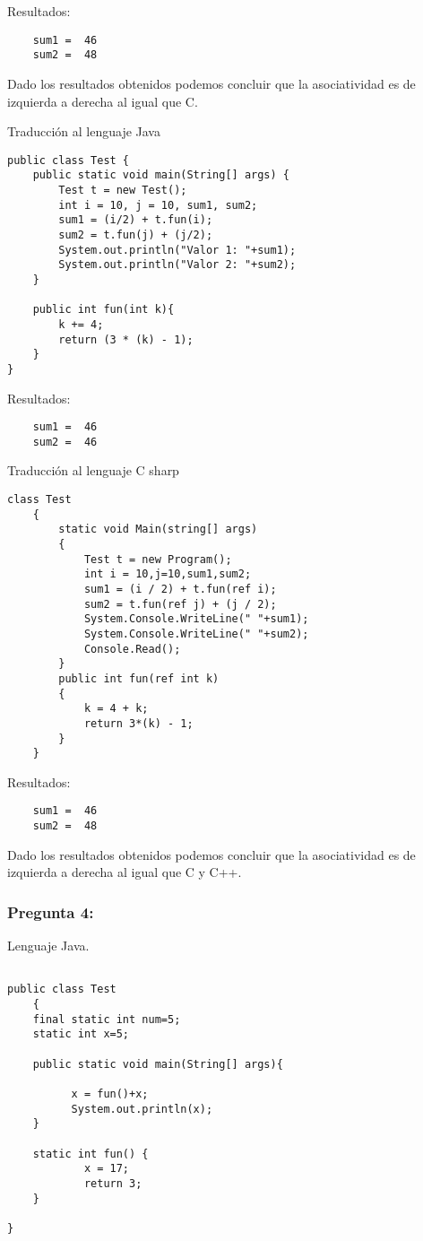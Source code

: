 \documentclass[11pt]{article}
\begin{document}
\noindent Resultados:
\begin{verbatim}
	sum1 =  46
	sum2 =  48
\end{verbatim}

Dado los resultados obtenidos podemos concluir que la asociatividad es de izquierda a derecha al igual que C.

Traducción al lenguaje Java

\begin{lstlisting}[frame = single]
public class Test {
    public static void main(String[] args) {
        Test t = new Test();
        int i = 10, j = 10, sum1, sum2;
        sum1 = (i/2) + t.fun(i);
        sum2 = t.fun(j) + (j/2);
        System.out.println("Valor 1: "+sum1);
        System.out.println("Valor 2: "+sum2);
    }

    public int fun(int k){
        k += 4;
        return (3 * (k) - 1);
    }
}
\end{lstlisting}
\noindent Resultados:
\begin{verbatim}
	sum1 =  46
	sum2 =  46
\end{verbatim}

Traducción al lenguaje C sharp

\begin{lstlisting}[frame = single]
class Test
    {
        static void Main(string[] args)
        {
            Test t = new Program();
            int i = 10,j=10,sum1,sum2;
            sum1 = (i / 2) + t.fun(ref i);
            sum2 = t.fun(ref j) + (j / 2);
            System.Console.WriteLine(" "+sum1);
            System.Console.WriteLine(" "+sum2);
            Console.Read();
        }
        public int fun(ref int k)
        {
            k = 4 + k;
            return 3*(k) - 1;
        }
    }
\end{lstlisting}
\noindent Resultados:
\begin{verbatim}
	sum1 =  46
	sum2 =  48
\end{verbatim}
Dado los resultados obtenidos podemos concluir que la asociatividad es de izquierda a derecha al igual que C y C++.

\subsubsection{Pregunta 4:}

Lenguaje Java.

\begin{lstlisting}[frame=single] 

public class Test
    {
    final static int num=5;
    static int x=5;
   
    public static void main(String[] args){
        
          x = fun()+x; 
          System.out.println(x); 
    }

    static int fun() {
            x = 17;
            return 3;
    }

}
\end{lstlisting}
\end{document}
